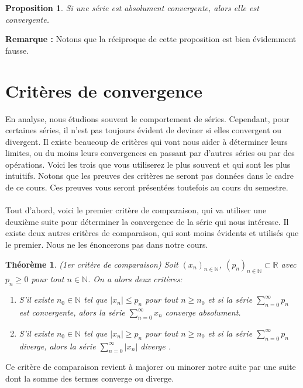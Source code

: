 \documentclass[oneside,12pt,french,table]{book}
\theoremstyle{definition}
\theoremstyle{plain}
\newtheorem{theorem}[definition]{Théorème}
\newtheorem{proposition}[definition]{Proposition}
\theoremstyle{remark}
\newcommand{\Nn}{{\mathbb{N}}}
\newcommand{\Rr}{{\mathbb{R}}}
\begin{document}
\begin{proposition}
    Si une série est absolument convergente, alors elle est convergente.
\end{proposition}
 
 \textbf{Remarque :} Notons que la réciproque de cette proposition est bien évidemment fausse. \newline 

\section{Critères de convergence}

En analyse, nous étudions souvent le comportement de séries. Cependant, pour certaines séries, il n'est pas toujours évident de deviner si elles convergent ou divergent. Il existe beaucoup de critères qui vont nous aider à déterminer leurs limites, ou du moins leurs convergences en passant par d'autres séries ou par des opérations. Voici les trois que vous utiliserez le plus souvent et qui sont les plus intuitifs. Notons que les preuves des critères ne seront pas données dans le cadre de ce cours. Ces preuves vous seront présentées toutefois au cours du semestre. 
\\
\\Tout d'abord, voici le premier critère de comparaison, qui va utiliser une deuxième suite pour déterminer la convergence de la série qui nous intéresse. Il existe deux autres critères de comparaison, qui sont moins évidents et utilisés que le premier. Nous ne les énoncerons pas dans notre cours.


\begin{theorem}\label{comparaison}
    (1er critère de comparaison)
    Soit $(x_n)_{n\in\Nn}$, $(p_n)_{n\in\Nn}\subset\Rr$ avec $p_n\geq0$ pour tout $n\in\Nn$.
    On a alors deux critères:
    \begin{enumerate}
        \item S'il existe $n_0 \in\Nn$ tel que $|x_n|\leq p_n$ pour tout $n\geq n_0$ et si la série $\sum_{n=0}^\infty p_n$ est convergente, alors la série $\sum_{n=0}^\infty x_n$ converge absolument.
       \item S'il existe $n_0 \in\Nn$ tel que $|x_n|\geq p_n$ pour tout $n\geq n_0$ et si la série $\sum_{n=0}^\infty p_n$ diverge, alors la série $\sum_{n=0}^\infty |x_n|$ diverge .
    \end{enumerate}
\end{theorem}
Ce critère de comparaison revient à majorer ou minorer notre suite par une suite dont la somme des termes converge ou diverge.\\
\end{document}
